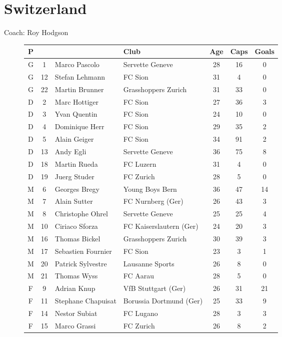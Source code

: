 \chapter{Switzerland}
\newline
\newline
Coach: Roy Hodgson
\begin{figure}[H]
\begin{tabular}{c c l l c c c}
P & & & Club & Age & Caps & Goals \\ \hline
G & 1 & Marco Pascolo & Servette Geneve & 28 & 16 & 0 \\
G & 12 & Stefan Lehmann & FC Sion & 31 & 4 & 0 \\
G & 22 & Martin Brunner & Grasshoppers Zurich & 31 & 33 & 0 \\ \hline
D & 2 & Marc Hottiger & FC Sion & 27 & 36 & 3 \\
D & 3 & Yvan Quentin & FC Sion & 24 & 10 & 0 \\
D & 4 & Dominique Herr & FC Sion & 29 & 35 & 2 \\
D & 5 & Alain Geiger & FC Sion & 34 & 91 & 2 \\
D & 13 & Andy Egli & Servette Geneve & 36 & 75 & 8 \\
D & 18 & Martin Rueda & FC Luzern & 31 & 4 & 0 \\
D & 19 & Juerg Studer & FC Zurich & 28 & 5 & 0 \\ \hline
M & 6 & Georges Bregy & Young Boys Bern & 36 & 47 & 14 \\
M & 7 & Alain Sutter & FC N{\”u}rnberg (Ger) & 26 & 43 & 3 \\
M & 8 & Christophe Ohrel & Servette Geneve & 25 & 25 & 4 \\
M & 10 & Ciriaco Sforza & FC Kaiserslautern (Ger) & 24 & 20 & 3 \\
M & 16 & Thomas Bickel & Grasshoppers Zurich & 30 & 39 & 3 \\
M & 17 & Sebastien Fournier & FC Sion & 23 & 3 & 1 \\
M & 20 & Patrick Sylvestre & Lausanne Sports & 26 & 8 & 0 \\
M & 21 & Thomas Wyss & FC Aarau & 28 & 5 & 0 \\ \hline
F & 9 & Adrian Knup & VfB Stuttgart (Ger) & 26 & 31 & 21 \\
F &11 & Stephane Chapuisat & Borussia Dortmund (Ger) & 25 & 33 & 9 \\
F &14 & Nestor Subiat & FC Lugano & 28 & 3 & 3 \\
F &15 & Marco Grassi & FC Zurich & 26 & 8 & 2 \\ \hline
\end{tabular}
\end{figure}
